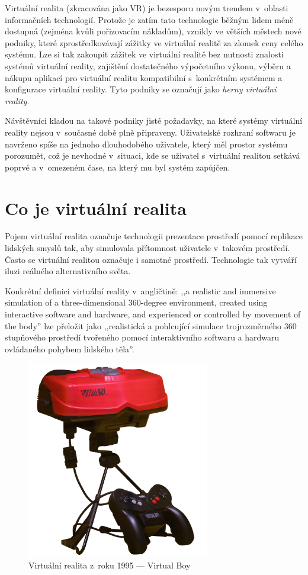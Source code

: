 Virtuální realita (zkracována jako VR) je bezesporu novým trendem
v~oblasti informačních technologií. Protože je zatím tato technologie běžným
lidem méně dostupná (zejména kvůli pořizovacím nákladům), vznikly ve větších městech nové podniky, které
zprostředkovávají zážitky ve virtuální realitě za zlomek ceny celého
systému. Lze si tak zakoupit zážitek ve virtuální realitě bez nutnosti znalosti systémů virtuální reality, zajištění
dostatečného výpočetního výkonu, výběru a nákupu aplikací pro virtuální
realitu kompatibilní s~konkrétním systémem a konfigurace virtuální reality. Tyto podniky se označují jako \emph{herny virtuální reality}. \autocite{herny}

Návštěvníci kladou na takové podniky jisté požadavky, na které
systémy virtuální reality nejsou v~současné době plně připraveny.
Uživatelské rozhraní softwaru je navrženo spíše na jednoho dlouhodobého
uživatele, který měl prostor systému porozumět, což je nevhodné
v~situaci, kde se uživatel s~virtuální realitou setkává poprvé a
v~omezeném čase, na který mu byl systém zapůjčen.

\section{Co je virtuální
realita}\label{co-je-virtuuxe1lnuxed-realita}

Pojem virtuální realita označuje technologii prezentace prostředí pomocí
replikace lidských smyslů tak, aby simulovala přítomnost uživatele
v~takovém prostředí. Často se virtuální realitou označuje i samotné
prostředí. Technologie tak vytváří iluzi reálného alternativního světa. \autocite{ovr}

Konkrétní definici virtuální reality v~angličtině: ,,a realistic and
immersive simulation of a three-dimensional 360-degree environment,
created using interactive software and hardware, and experienced or
controlled by movement of the body'' \autocite{vrdef} lze přeložit jako ,,realistická a
pohlcující simulace trojrozměrného 360 stupňového prostředí tvořeného
pomocí interaktivního softwaru a hardwaru ovládaného pohybem lidského
těla''.

\begin{figure}[b]
\centering
\includegraphics[width=8cm]{src/assets/virtual-boy.jpg}
\caption{Virtuální realita z~roku 1995 --- Virtual Boy\autocite{virtualboypic}}
\end{figure}

